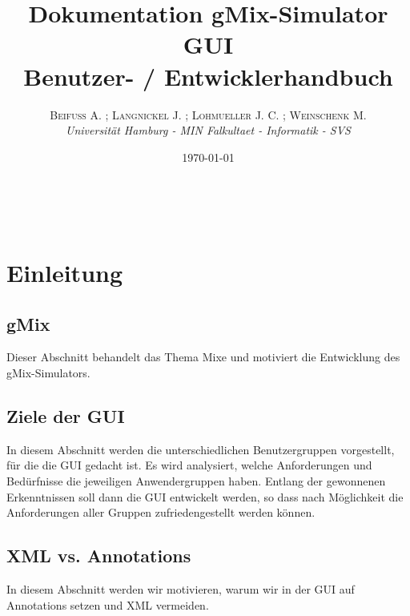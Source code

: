 \documentclass[a4paper, 11pt]{article} %
\title{\textbf{Dokumentation gMix-Simulator GUI}\\ %
Benutzer- / Entwicklerhandbuch} %
\author{\textsc{Beifuß A. ; Langnickel J. ; Lohmueller J. C. ; Weinschenk M.} %
\\{\textit{Universität Hamburg - MIN Falkultaet - Informatik - SVS}}} %
\date{\today} %
\makeatletter
\renewcommand{\maketitle}{ %
\begin{flushright} %
{\LARGE\@title} %

\vspace{50pt} %

{\large\@author} %
\\\@date %

\vspace{40pt} %
\end{flushright}
}
\makeatother
\begin{document}
\maketitle %

 


\tableofcontents


\vspace{30pt} %

\section{Einleitung} %
\label{sec:einleitung}

\subsection{gMix} %
\label{sub:gmix}
Dieser Abschnitt behandelt das Thema Mixe und motiviert die Entwicklung des gMix-Simulators.

\subsection{Ziele der GUI} %
\label{sub:ziele_der_gui}
In diesem Abschnitt werden die unterschiedlichen Benutzergruppen vorgestellt, für die die GUI gedacht ist. Es wird analysiert, welche Anforderungen und Bedürfnisse die jeweiligen Anwendergruppen haben. Entlang der gewonnenen Erkenntnissen soll dann die GUI entwickelt werden, so dass nach Möglichkeit die Anforderungen aller Gruppen zufriedengestellt werden können.

\subsection{XML vs. Annotations} %
\label{sub:xml}
In diesem Abschnitt werden wir motivieren, warum wir in der GUI auf Annotations setzen und XML vermeiden.
\end{document}
